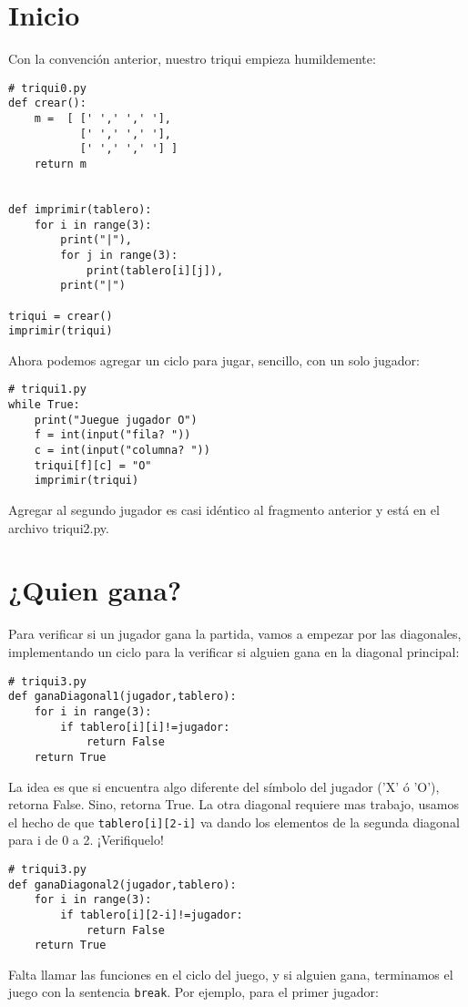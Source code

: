 \section{Inicio}

Con la convención anterior, nuestro triqui empieza humildemente:

\begin{lstlisting}
# triqui0.py
def crear():
    m =  [ [' ',' ',' '],
           [' ',' ',' '],
           [' ',' ',' '] ]
    return m


def imprimir(tablero):
    for i in range(3):
        print("|"),
        for j in range(3):
            print(tablero[i][j]),
        print("|")
        
triqui = crear()
imprimir(triqui)
\end{lstlisting}
Ahora podemos agregar un ciclo para jugar, sencillo, con un solo jugador:\pagebreak{}

\begin{lstlisting}
# triqui1.py
while True:
    print("Juegue jugador O")
    f = int(input("fila? "))
    c = int(input("columna? "))
    triqui[f][c] = "O"
    imprimir(triqui)
\end{lstlisting}
Agregar al segundo jugador es casi idéntico al fragmento anterior
y está en el archivo triqui2.py.

\section{¿Quien gana?}

Para verificar si un jugador gana la partida, vamos a empezar por
las diagonales, implementando un ciclo para la verificar si alguien
gana en la diagonal principal:

\begin{lstlisting}
# triqui3.py
def ganaDiagonal1(jugador,tablero):
    for i in range(3):
        if tablero[i][i]!=jugador:
            return False
    return True
\end{lstlisting}
La idea es que si encuentra algo diferente del símbolo del jugador
('X' ó 'O'), retorna False. Sino, retorna True. La otra diagonal requiere
mas trabajo, usamos el hecho de que \texttt{tablero{[}i{]}{[}2-i{]}}
va dando los elementos de la segunda diagonal para i de 0 a 2. ¡Verifiquelo!

\begin{lstlisting}
# triqui3.py
def ganaDiagonal2(jugador,tablero):
    for i in range(3):
        if tablero[i][2-i]!=jugador:
            return False
    return True
\end{lstlisting}
Falta llamar las funciones en el ciclo del juego, y si alguien gana,
terminamos el juego con la sentencia \texttt{break}. Por ejemplo,
para el primer jugador:

